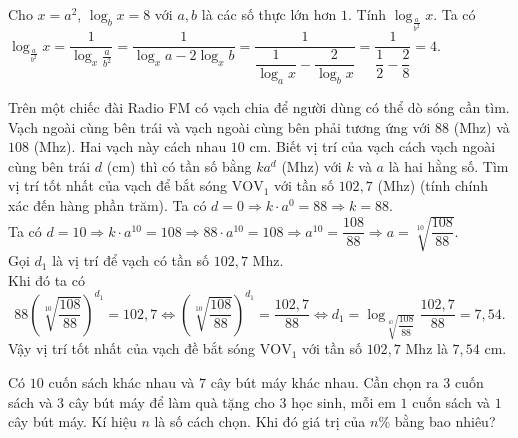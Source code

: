 \begin{ex}%
Cho $x=a^2$, $\log _b x = 8$ với $a, b$ là các số thực lớn hơn $1$. Tính $\log_{\frac{a}{b^2}} x$.
\loigiai
{
Ta có $\log_{\frac{a}{b^2}} x=\dfrac{1}{\log_x \frac{a}{b^2}}=\dfrac{1}{\log_x a-2\log_x b}=\dfrac{1}{\dfrac{1}{\log_a x}-\dfrac{2}{\log_b x}}=\dfrac{1}{\dfrac{1}{2}-\dfrac{2}{8}}=4$.
}
\end{ex}

\begin{ex}%
Trên một chiếc đài Radio FM có vạch chia để người dùng có thể dò sóng cần tìm. Vạch ngoài cùng bên trái và vạch ngoài cùng bên phải tương ứng với $88$ (Mhz) và $108$ (Mhz). Hai vạch này cách nhau $10$ cm. Biết vị trí của vạch cách vạch ngoài cùng bên trái $d$ (cm) thì có tần số bằng $ka^d$ (Mhz) với $k$ và $a$ là hai hằng số. Tìm vị trí tốt nhất của vạch để bắt sóng $\mathrm{VOV}_1$ với tần số $102{,}7$ (Mhz) (tính chính xác đến hàng phần trăm).
\loigiai
{
Ta có	$d=0 \Rightarrow k\cdot a^0=88 \Rightarrow k=88$. \\
Ta có $d=10 \Rightarrow k\cdot a^{10}=108 \Rightarrow 88\cdot a^{10}=108 \Rightarrow a^{10}=\dfrac{108}{88} \Rightarrow a=\sqrt[10]{\dfrac{108}{88}}$.\\
Gọi $d_1$ là vị trí để vạch có tần số $102{,}7$ Mhz. \\
Khi đó ta có
$$88\left(\sqrt[10]{\dfrac{108}{88}}\right)^{d_1}=102{,}7 \Leftrightarrow\left(\sqrt[10]{\dfrac{108}{88}}\right)^{d_1}=\dfrac{102{,}7}{88} \Leftrightarrow d_1=\log _{\sqrt[10]{\dfrac{108}{88}}} \dfrac{102{,}7}{88}=7{,}54.$$
Vậy vị trí tốt nhất của vạch đề bắt sóng $\mathrm{VOV}_1$ với tần số $102{,}7$ Mhz là $7{,}54$ cm.		
}
\end{ex}

\begin{ex}%
	Có $10$ cuốn sách khác nhau và $7$ cây bút máy khác nhau. Cần chọn ra $3$ cuốn sách và $3$ cây bút máy để làm quà tặng cho $3$ học sinh, mỗi em $1$ cuốn sách và $1$ cây bút máy. Kí hiệu $n$ là số cách chọn. Khi đó giá trị của $n\%$ bằng bao nhiêu?
\end{ex}

